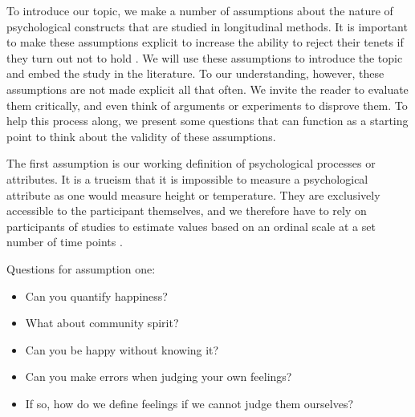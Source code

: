 \documentclass[utf8]{FrontiersinVancouver}
\begin{document}
To introduce our topic, we make a number of assumptions about the nature of psychological constructs that are studied in longitudinal methods. It is important to make these assumptions explicit to increase the ability to reject their tenets if they turn out not to hold \citep{meehlTheoreticalRisksTabular2004}. We will use these assumptions to introduce the topic and embed the study in the literature. To our understanding, however, these assumptions are not made explicit all that often. We invite the reader to evaluate them critically, and even think of arguments or experiments to disprove them. To help this process along, we present some questions that can function as a starting point to think about the validity of these assumptions. 

The first assumption is our working definition of psychological processes or attributes. It is a trueism that it is impossible to measure a psychological attribute as one would measure height or temperature. They are exclusively accessible to the participant themselves, and we therefore have to rely on participants of studies to estimate values based on an ordinal scale at a set number of time points \citep{friedWhatArePsychological2017, maraunAugustinianMethodologicalFamily2009}. 

\begin{framed} 
    Questions for assumption one:
    \begin{itemize}
        \item Can you quantify happiness?
        \item What about community spirit?
        \item Can you be happy without knowing it?
        \item Can you make errors when judging your own feelings?
        \item If so, how do we define feelings if we cannot judge them ourselves?
    \end{itemize}
\end{framed}
\end{document}
